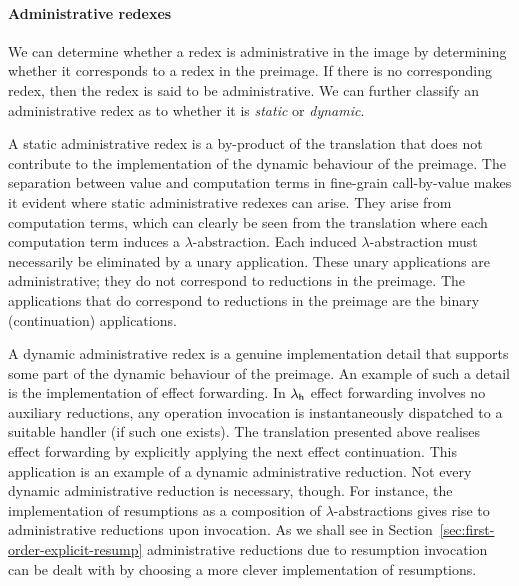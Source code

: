 \documentclass[12pt,phd,lfcs,twoside,openright,logo,leftchapter,normalheadings]{infthesis}
\theoremstyle{plain}
\theoremstyle{definition}
\begin{document}
\paragraph{Administrative redexes}

We can determine whether a redex is administrative in the image by
determining whether it corresponds to a redex in the preimage. If
there is no corresponding redex, then the redex is said to be
administrative. We can further classify an administrative redex as to
whether it is \emph{static} or \emph{dynamic}.

A static administrative redex is a by-product of the translation that
does not contribute to the implementation of the dynamic behaviour of
the preimage.
%
The separation between value and computation terms in fine-grain
call-by-value makes it evident where static administrative redexes can
arise. They arise from computation terms, which can clearly be seen
from the translation where each computation term induces a
$\lambda$-abstraction. Each induced $\lambda$-abstraction must
necessarily be eliminated by a unary application. These unary
applications are administrative; they do not correspond to reductions
in the preimage. The applications that do correspond to reductions in
the preimage are the binary (continuation) applications.

A dynamic administrative redex is a genuine implementation detail that
supports some part of the dynamic behaviour of the preimage. An
example of such a detail is the implementation of effect
forwarding. In $\lambda_{\mathsf{h}}$ effect forwarding involves no auxiliary
reductions, any operation invocation is instantaneously dispatched to
a suitable handler (if such one exists).
%
The translation presented above realises effect forwarding by
explicitly applying the next effect continuation. This application is
an example of a dynamic administrative reduction. Not every dynamic
administrative reduction is necessary, though. For instance, the
implementation of resumptions as a composition of
$\lambda$-abstractions gives rise to administrative reductions upon
invocation. As we shall see in
Section~\ref{sec:first-order-explicit-resump} administrative
reductions due to resumption invocation can be dealt with by choosing
a more clever implementation of resumptions.
\end{document}
